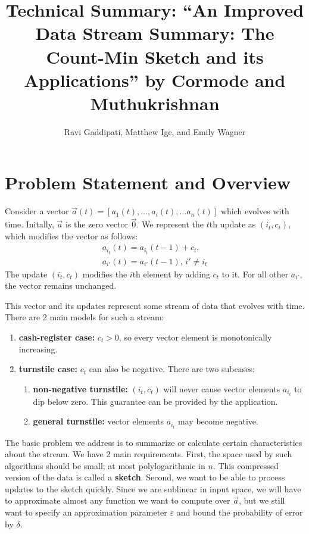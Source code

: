 \documentclass[11pt]{article}
\title{Technical Summary: ``An Improved Data Stream Summary: The Count-Min Sketch and its Applications'' 
by Cormode and Muthukrishnan}
\author{Ravi Gaddipati, Matthew Ige, and Emily Wagner}
\begin{document}
\maketitle
\section{Problem Statement and Overview}
Consider a vector $\vec{a}(t) = [a_1(t), \dots, a_i(t), \dots a_n(t)]$ which evolves with time.
Initally, $\vec{a}$ is the zero vector $\vec{0}$.  We represent the $t$th update as $(i_t, c_t)$,
which modifies the vector as follows:
\begin{align}
    a_{i_t}(t) = a_{i_t}(t - 1) + c_t, \\
    a_{i'}(t) = a_{i'}(t - 1), \, i' \neq i_t
\end{align}
The update $(i_t, c_t)$ modifies the $i$th element by adding $c_t$ to it.
For all other $a_{i'}$, the vector remains unchanged. 

This vector and its updates represent some stream of data that evolves with
time. There are 2 main models for such a stream:
\begin{enumerate}
    \item \textbf{cash-register case:} $c_t > 0$, so every vector element is monotonically
    increasing.
    \item \textbf{turnstile case:} $c_t$ can also be negative.  There are two subcases:
    \begin{enumerate}
        \item \textbf{non-negative turnstile:} $(i_t, c_t)$ will never cause vector elements
        $a_{i_t}$ to dip below zero. This guarantee can be provided by the application.
        \item \textbf{general turnstile:} vector elements $a_{i_t}$ may become negative.
    \end{enumerate}
\end{enumerate}

The basic problem we address is to summarize or calculate certain characteristics
about the stream. We have 2 main requirements. First, the space used by such algorithms should be small; at most polylogarithmic
in $n$.  This compressed version of the data is called a \textbf{sketch}.  Second, we want to be
able to process updates to the sketch quickly.  Since we are sublinear in input space,
we will have to approximate almost any function we want to compute over $\vec{a}$, but
we still want to specify an approximation parameter $\varepsilon$ and bound the probability
of error by $\delta$.  
\end{document}
